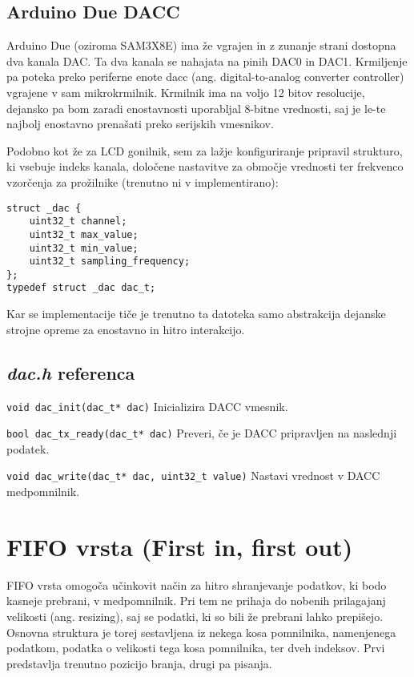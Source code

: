 \documentclass[12pt,a4paper,twoside,openright,slovene]{book}
\begin{document}
\subsection{Arduino Due DACC}
Arduino Due (oziroma SAM3X8E) ima že vgrajen in z zunanje strani dostopna dva kanala DAC. Ta dva kanala se nahajata na pinih DAC0 in DAC1. Krmiljenje pa poteka preko periferne enote dacc (ang. digital-to-analog converter controller) vgrajene v sam mikrokrmilnik. Krmilnik ima na voljo 12 bitov resolucije, dejansko pa bom zaradi enostavnosti uporabljal 8-bitne vrednosti, saj je le-te najbolj enostavno prenašati preko serijskih vmesnikov.

Podobno kot že za LCD gonilnik, sem za lažje konfiguriranje pripravil strukturo, ki vsebuje indeks kanala, določene nastavitve za območje vrednosti ter frekvenco vzorčenja za prožilnike (trenutno ni v implementirano):
\begin{lstlisting}
struct _dac {
    uint32_t channel;
    uint32_t max_value;
    uint32_t min_value;
    uint32_t sampling_frequency;
};
typedef struct _dac dac_t;
\end{lstlisting}

Kar se implementacije tiče je trenutno ta datoteka samo abstrakcija dejanske strojne opreme za enostavno in hitro interakcijo.


\subsection{\textit{dac.h} referenca}

\lstinline{void dac_init(dac_t* dac)}\newline
Inicializira DACC vmesnik.

\lstinline{bool dac_tx_ready(dac_t* dac)}\newline
Preveri, če je DACC pripravljen na naslednji podatek.

\lstinline{void dac_write(dac_t* dac, uint32_t value)}\newline
Nastavi vrednost v DACC medpomnilnik.



\section{FIFO vrsta (First in, first out)}
FIFO vrsta omogoča učinkovit način za hitro shranjevanje podatkov, ki bodo kasneje prebrani, v medpomnilnik. Pri tem ne prihaja do nobenih prilagajanj velikosti (ang. resizing), saj se podatki, ki so bili že prebrani lahko prepišejo. Osnovna struktura je torej sestavljena iz nekega kosa pomnilnika, namenjenega podatkom, podatka o velikosti tega kosa pomnilnika, ter dveh indeksov. Prvi predstavlja trenutno pozicijo branja, drugi pa pisanja.
\end{document}
